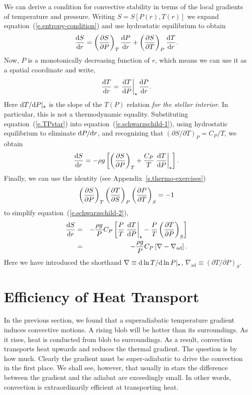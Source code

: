 We can derive a condition for convective stability in terms of the local gradients of temperature and pressure. Writing $S = S[P(r),T(r)]$ we expand equation~(\ref{e.entropy-condition}) and use hydrostatic equilibrium to obtain
\begin{equation}\label{e.schwarzschild-1}
\frac{\mathrm{d} S}{\mathrm{d} r} = \left(\frac{\partial S}{\partial P}\right)_{T} \frac{\mathrm{d} P}{\mathrm{d} r} + \left(\frac{\partial S}{\partial T}\right)_{P}\frac{\mathrm{d} T}{\mathrm{d} r} .
\end{equation}
Now, $P$ is a monotonically decreasing function of $r$, which means we can use it as a spatial coordinate and write,
\begin{equation}\label{e.TPstar}
\frac{\mathrm{d} T}{\mathrm{d} r} = \left.\frac{\mathrm{d} T}{\mathrm{d} P}\right|_{\star} \frac{\mathrm{d} P}{\mathrm{d} r} .
\end{equation}
Here $\mathrm{d} T/\mathrm{d} P|_{\star}$ is the slope of the $T(P)$ relation \emph{for the stellar interior}.  In particular, this is not a thermodynamic equality. Substituting equation~(\ref{e.TPstar}) into equation~(\ref{e.schwarzschild-1}), using hydrostatic equilibrium to eliminate $\mathrm{d} P/\mathrm{d} r$, and recognizing that $(\partial S/\partial T)_{P} = C_{P}/T$, we obtain
\begin{equation}\label{e.schwarzschild-2}
\frac{\mathrm{d} S}{\mathrm{d} r} =  -\rho g\left[\left(\frac{\partial S}{\partial P}\right)_{T} + \frac{C_{P}}{T} \left.\frac{\mathrm{d} T}{\mathrm{d} P}\right|_{\star} \right].
\end{equation}
Finally, we can use the identity (see Appendix~\ref{s.thermo-exercises})
\begin{equation}
\left(\frac{\partial S}{\partial P}\right)_{T}\left(\frac{\partial T}{\partial S}\right)_{P}\left(\frac{\partial P}{\partial T}\right)_{S} = -1
\end{equation}
to simplify equation~(\ref{e.schwarzschild-2}),
\begin{eqnarray}
\frac{\mathrm{d} S}{\mathrm{d} r} &=& -\frac{\rho g}{P}C_{P}\left[\frac{P}{T}\left.\frac{\mathrm{d} T}{\mathrm{d} P}\right|_{\star} - \frac{P}{T}\left(\frac{\partial T}{\partial P}\right)_{S}\right]\nonumber \\
 & = & -\frac{\rho g}{P}C_{P}\left[\nabla - \nabla_{\mathrm{ad}}\right].
 \label{e.schwarzschild}
\end{eqnarray}
Here we have introduced the shorthand $\nabla\equiv \mathrm{d} \ln T/\mathrm{d}\ln P|_{\star}$, $\nabla_{\mathrm{ad}} \equiv \left(\partial T/\partial P\right)_{S}$.
 
\section{Efficiency of Heat Transport}

In the previous section, we found that a superadiabatic temperature gradient induces convective motions. A rising blob will be hotter than its surroundings.  As it rises, heat is conducted from blob to surroundings. As a result, convection transports heat upwards and reduces the thermal gradient. The question is by how much.  Clearly the gradient must be super-adiabatic to drive the convection in the first place. We shall see, however, that usually in stars the difference between the gradient and the adiabat are exceedingly small. In other words, convection is extraordinarily efficient at transporting heat.

